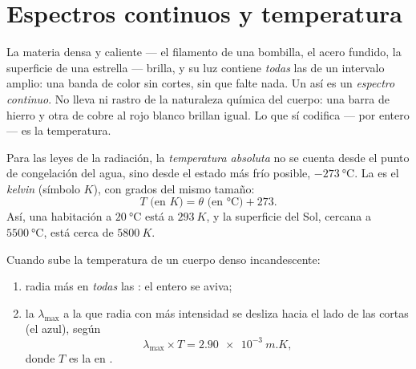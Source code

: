 \section{Espectros continuos y temperatura}

\begin{definition}\label{def:g10:light-spectra:continuous}
La materia densa y caliente --- el filamento de una bombilla, el acero
fundido, la superficie de una estrella --- brilla, y su luz contiene
\emph{todas} las  de un intervalo amplio: una banda de
color sin cortes, sin que falte nada. Un  así es un
\emph{espectro continuo}. No lleva ni rastro de
la naturaleza química del cuerpo: una barra de hierro y otra de cobre
al rojo blanco brillan igual. Lo que sí codifica --- por entero --- es
la temperatura.
\end{definition}

\begin{definition}\label{def:g10:light-spectra:kelvin}
Para las leyes de la radiación, la \emph{temperatura
absoluta} no se cuenta desde el punto de
congelación del agua, sino desde el estado más frío posible,
$\qty{-273}{\degreeCelsius}$. La  es el
\emph{kelvin} (símbolo $\unit{K}$), con grados del mismo
tamaño:
\[
T \text{ (en } \unit{K}) = \theta \text{ (en } \unit{\degreeCelsius}) + 273 .
\]
Así, una habitación a $\qty{20}{\degreeCelsius}$ está a $\qty{293}{K}$,
y la superficie del Sol, cercana a $\qty{5500}{\degreeCelsius}$, está
cerca de $\qty{5800}{K}$.
\end{definition}

\begin{proposition}\label{prop:g10:light-spectra:wien}
Cuando sube la temperatura de un cuerpo denso incandescente:
\begin{enumerate}
  \item radia más en \emph{todas} las : el 
        entero se aviva;
  \item la  $\lambda_{\max}$ a la que radia con más
        intensidad se desliza hacia el lado de las 
        cortas (el azul), según
        \[
        \lambda_{\max} \times T = \qty{2.90e-3}{m.K},
        \]
        donde $T$ es la  en .
\end{enumerate}
\end{proposition}
\admitted

